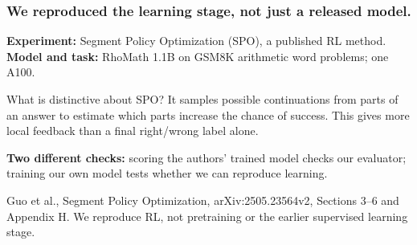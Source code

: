 \documentclass[aspectratio=169,11pt]{beamer}
\newcommand{\source}[1]{\vfill{\scriptsize\color{Gray}#1\par}}
\begin{document}
\begin{frame}[t]
\frametitle{We reproduced the learning stage, not just a released model.}
\textbf{Experiment:} Segment Policy Optimization (SPO), a published RL method.\\
\textbf{Model and task:} RhoMath 1.1B on GSM8K arithmetic word problems; one A100.
\medskip
\begin{center}
\end{center}
\begin{block}{What is distinctive about SPO?}
It samples possible continuations from parts of an answer to estimate which
parts increase the chance of success. This gives more local feedback than a final right/wrong label alone.
\end{block}
\textbf{Two different checks:} scoring the authors' trained model checks our
evaluator; training our own model tests whether we can reproduce learning.
\source{Guo et al., Segment Policy Optimization, arXiv:2505.23564v2, Sections 3--6 and Appendix H. We reproduce RL, not pretraining or the earlier supervised learning stage.}
\end{frame}
\end{document}
